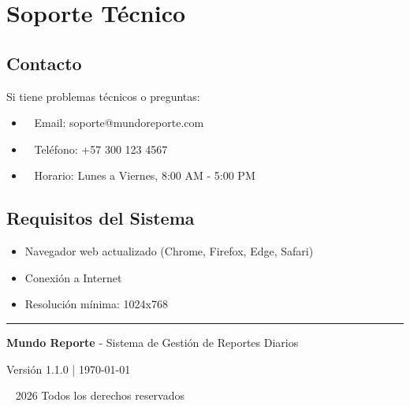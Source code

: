 \documentclass[12pt,a4paper]{article}
\begin{document}
\newpage

\section{Soporte Técnico}

\subsection{Contacto}

Si tiene problemas técnicos o preguntas:

\begin{itemize}
    \item \faEnvelope~ Email: soporte@mundoreporte.com
    \item \faPhone~ Teléfono: +57 300 123 4567
    \item \faClock~ Horario: Lunes a Viernes, 8:00 AM - 5:00 PM
\end{itemize}

\subsection{Requisitos del Sistema}

\begin{itemize}
    \item Navegador web actualizado (Chrome, Firefox, Edge, Safari)
    \item Conexión a Internet
    \item Resolución mínima: 1024x768
\end{itemize}

\vfill

\begin{center}
\rule{0.5\textwidth}{0.4pt}

\textbf{Mundo Reporte} - Sistema de Gestión de Reportes Diarios

Versión 1.1.0 | \today

\textcopyright~ 2026 Todos los derechos reservados
\end{center}
\end{document}
